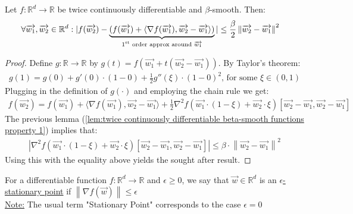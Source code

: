 \documentclass[12pt]{article}
\newcommand{\norm}[1]{\left\| #1 \right\|}
\begin{document}
	\begin{lemma}
	\label{lem:twice continuously differentiable beta-smooth functions property 2}
		Let $f:\mathbb{R}^d\to\mathbb{R}$ be twice continuously differentiable and $\beta$-smooth. Then:
		\begin{align*}
		    & \forall \overrightarrow{w_1}, \overrightarrow{w_2} \in \mathbb{R}^d :  |f(\overrightarrow{w_2}) - \underbrace{(f(\overrightarrow{w_1}) + \langle\nabla{f(\overrightarrow{w_1})}, \overrightarrow{w_2}-\overrightarrow{w_1}\rangle)}_\text{1\textsuperscript{st} order approx around $\overrightarrow{w_1}$}| \leq \frac{\beta}{2}\norm{\overrightarrow{w_2}-\overrightarrow{w_1}}^2
	    \end{align*}
	\end{lemma}
	\begin{proof}
	    Define $g:\mathbb{R}\to\mathbb{R}$ by $g(t)=f(\overrightarrow{w_1} + t(\overrightarrow{w_2}-\overrightarrow{w_1}))$. By Taylor's theorem:
		\begin{align*}
		    g(1) = g(0) + g'(0)\cdot(1-0) + \frac{1}{2}g''(\xi)\cdot(1-0)^2 \text{, for some $\xi\in(0,1)$}
        \end{align*}
	    Plugging in the definition of $g(\cdot)$ and employing the chain rule we get:
		\begin{align*}
		    f(\overrightarrow{w_2}) = f(\overrightarrow{w_1}) + \langle\nabla{f(\overrightarrow{w_1})},\overrightarrow{w_2}-\overrightarrow{w_1}\rangle + \frac{1}{2}\nabla^2{f(\overrightarrow{w_1}\cdot(1-\xi) + \overrightarrow{w_2}\cdot\xi)[\overrightarrow{w_2}-\overrightarrow{w_1},\overrightarrow{w_2}-\overrightarrow{w_1}]}
        \end{align*}
        The previous lemma (\ref{lem:twice continuously differentiable beta-smooth functions property 1}) implies that:
		\begin{align*}
		    |\nabla^2{f(\overrightarrow{w_1}\cdot(1-\xi) + \overrightarrow{w_2}\cdot\xi)[\overrightarrow{w_2}-\overrightarrow{w_1},\overrightarrow{w_2}-\overrightarrow{w_1}]}| \leq \beta\cdot\norm{\overrightarrow{w_2}-\overrightarrow{w_1}}^2
        \end{align*}
        Using this with the equality above yields the sought after result.
	\end{proof}
	\begin{definition}
	For a differentiable function $f:\mathbb{R}^d\to\mathbb{R}$ and $\epsilon\geq0$, we say that $\overrightarrow{w}\in\mathbb{R}^d$ is an \underline{$\epsilon$-stationary point} if $\norm{\nabla{f(\overrightarrow{w})}}\leq\epsilon$
	\\\underline{Note:} The usual term "Stationary Point" corresponds to the case $\epsilon=0$
	\end{definition}
\end{document}
